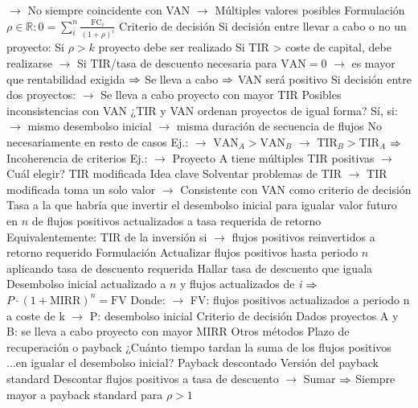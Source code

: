 \documentclass{nuevotema}
\begin{document}
\begin{esquemal}
				\4[] $\to$ No siempre coincidente con VAN
				\4[] $\to$ Múltiples valores posibles
			\3 Formulación
				\4 $\rho \in \mathbb{R}: 0 = \sum_i^n \frac{\text{FC}_i}{(1+\rho)^i}$
			\3 Criterio de decisión
				\4 Si decisión entre llevar a cabo o no un proyecto:
				\4 Si $\rho > k$ proyecto debe ser realizado
				\4[] Si TIR > coste de capital, debe realizarse
				\4[] $\to$ Si TIR/tasa de descuento necesaria para $\text{VAN}=0$
				\4[] $\to$ es mayor que rentabilidad exigida
				\4[] $\Rightarrow$ Se lleva a cabo
				\4[] $\Rightarrow$ VAN será positivo
				\4 Si decisión entre dos proyectos:
				\4[] $\to$ Se lleva a cabo proyecto con mayor TIR
				\4 Posibles inconsistencias con VAN
				\4[] ¿TIR y VAN ordenan proyectos de igual forma?
				\4[] Sí, si:
				\4[] $\to$ mismo desembolso inicial
				\4[] $\to$ misma duración de secuencia de flujos
				\4[] No necesariamente en resto de casos
				\4[] Ej.:
				\4[] $\to$ $\text{VAN}_A > \text{VAN}_B$
				\4[] $\to$ $\text{TIR}_B > \text{TIR}_A$
				\4[] $\Rightarrow$ Incoherencia de criterios
				\4[] Ej.:
				\4[] $\to$ Proyecto A tiene múltiples TIR positivas
				\4[] $\to$ Cuál elegir?
		\2 TIR modificada
			\3 Idea clave
				\4 Solventar problemas de TIR
				\4[] $\to$ TIR modificada toma un solo valor
				\4[] $\to$ Consistente con VAN como criterio de decisión
				\4 Tasa a la que habría que invertir el desembolso inicial
				\4[] para igualar valor futuro en $n$ de flujos positivos
				\4[] actualizados a tasa requerida de retorno
				\4 Equivalentemente:
				\4[] TIR de la inversión si
				\4[] $\to$ flujos positivos reinvertidos a retorno requerido
			\3 Formulación
				\4[i] Actualizar flujos positivos hasta periodo $n$
				\4[] aplicando tasa de descuento requerida
				\4[ii] Hallar tasa de descuento que iguala
				\4[] Desembolso inicial actualizado a $n$
				\4[] y flujos actualizados de \textit{i}
				\4 
				\4[] $\Rightarrow$ $P\cdot(1+\text{MIRR})^n = \text{FV}$
				\4[] Donde:
				\4[] $\to$ FV: flujos positivos actualizados a periodo n a coste de k
				\4[] $\to$ P: desembolso inicial
			\3 Criterio de decisión
				\4 Dados proyectos A y B:
				\4[] se lleva a cabo proyecto con mayor MIRR
		\2 Otros métodos
			\3 Plazo de recuperación o payback
				\4 ¿Cuánto tiempo tardan la suma de los flujos positivos
				\4[] ...en igualar el desembolso inicial?
				\4 Payback descontado
				\4[] Versión del payback standard
				\4[] Descontar flujos positivos a tasa de descuento
				\4[] $\to$ Sumar
				\4[] $\Rightarrow$ Siempre mayor a payback standard para $\rho > 1$

\end{esquemal}
\end{document}
